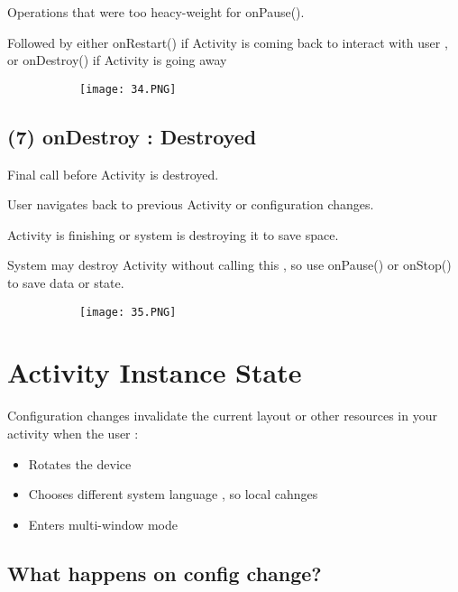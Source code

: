 \documentclass{article}
\begin{document}
  Operations that were too heacy-weight for onPause().

  Followed by either onRestart() if Activity is coming back to interact with user , or onDestroy() if Activity is going away


        \begin{figure}[ht!]
  \centering
  \begin{subfigure}[b]{0.5\linewidth}
    \texttt{[image: 34.PNG]}
  \end{subfigure}
  \end{figure}

\subsection{(7) onDestroy : Destroyed}

  Final call before Activity is destroyed.

  User navigates back to previous Activity or configuration changes.

  Activity is finishing or system is destroying it to save space.

  System may destroy Activity without calling this , so use onPause() or onStop() to save data or state.

          \begin{figure}[ht!]
  \centering
  \begin{subfigure}[b]{0.5\linewidth}
    \texttt{[image: 35.PNG]}
  \end{subfigure}
  \end{figure}

  \section{Activity Instance State}

  Configuration changes invalidate the current layout or other resources in your activity when the user : 

  \begin{itemize}
      \item Rotates the device
      \item Chooses different system language , so local cahnges
      \item Enters multi-window mode
  \end{itemize}

  \subsection{What happens on config change?}
\end{document}
